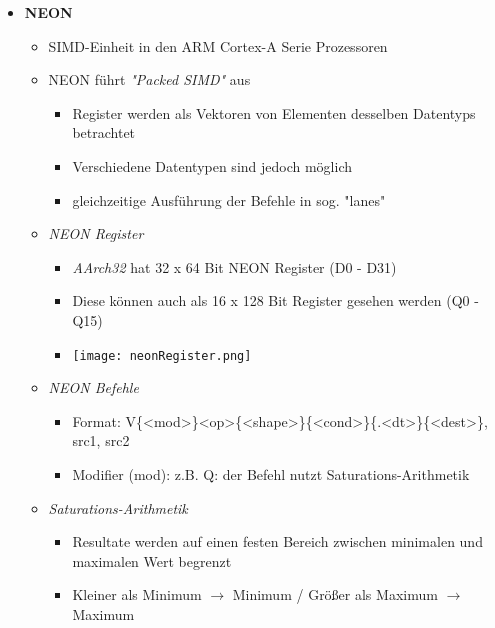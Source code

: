 \begin{itemize}
        \item \textbf{NEON}
            \begin{itemize}
                \item SIMD-Einheit in den ARM Cortex-A Serie Prozessoren
                \item NEON führt \textit{\string"Packed SIMD\string"} aus
                    \begin{itemize}
                        \item Register werden als Vektoren von Elementen desselben Datentyps betrachtet
                        \item Verschiedene Datentypen sind jedoch möglich
                        \item gleichzeitige Ausführung der Befehle in sog. \string"lanes\string"
                    \end{itemize}
                \item \textit{NEON Register}
                    \begin{itemize}
                        \item \textit{AArch32} hat 32 x 64 Bit NEON Register (D0 - D31)
                        \item Diese können auch als 16 x 128 Bit Register gesehen werden (Q0 - Q15)
                        \item[] \texttt{[image: neonRegister.png]}
                    \end{itemize}
                \item \textit{NEON Befehle}
                    \begin{itemize}
                        \item Format: V\{<mod>\}<op>\{<shape>\}\{<cond>\}\{.<dt>\}\{<dest>\}, src1, src2
                        \item Modifier (mod): z.B. Q: der Befehl nutzt Saturations-Arithmetik
                    \end{itemize}
                \item \textit{Saturations-Arithmetik}
                    \begin{itemize}
                        \item Resultate werden auf einen festen Bereich zwischen minimalen und maximalen Wert begrenzt
                        \item Kleiner als Minimum $\rightarrow$ Minimum / Grö\ss er als Maximum $\rightarrow$ Maximum
                    \end{itemize}

\end{itemize}
\end{itemize}
